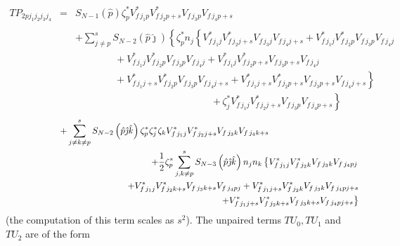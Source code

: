 \documentclass[aps,preprint]{revtex4}
\begin{document}
\begin{eqnarray*}
TP_{2pj_{1}j_{2}j_{3}j_{4}} &=&S_{N-1}\left( \hat{p}\right) \zeta _{p}^{\ast
}V_{f\,j_{1}p}^{\ast }V_{f\,j_{2}p+s}^{\ast }V_{f\,j_{3}p}V_{f\,j_{4}p+s} \\
&& \\
&&+\sum_{j\neq p}^{s}S_{N-2}\left( \hat{p}\hat{\jmath}\right) \left\{ \zeta
_{p}^{\ast }n_{j}\left\{ V_{f\,j_{1}j}^{\ast }V_{f\,j_{2}j+s}^{\ast
}V_{f\,j_{3}j}V_{f\,j_{4}j+s}+V_{f\,j_{1}j}^{\ast }V_{f\,j_{2}p}^{\ast
}V_{f\,j_{3}p}V_{f\,j_{4}j}\right. \right.  \\
&&\qquad \qquad +V_{f\,j_{1}j}^{\ast }V_{f\,j_{2}p}^{\ast
}V_{f\,j_{3}p}V_{f\,j_{4}j}+V_{f\,j_{1}j}^{\ast }V_{f\,j_{2}p+s}^{\ast
}V_{f\,j_{3}p+s}V_{f\,j_{4}j} \\
&&\qquad \qquad +\left. V_{f\,j_{1}j+s}^{\ast }V_{f\,j_{2}p}^{\ast
}V_{f\,j_{3}p}V_{f\,j_{4}j+s}+V_{f\,j_{1}j+s}^{\ast }V_{f\,j_{2}p+s}^{\ast
}V_{f\,j_{3}p+s}V_{f\,j_{4}j+s}\right\}  \\
&&\qquad \qquad \qquad \qquad \qquad \qquad \qquad \left. +\,\zeta
_{j}^{\ast }V_{f\,j_{1}j}^{\ast }V_{f\,j_{2}j+s}^{\ast
}V_{f\,j_{3}p}V_{f\,j_{4}p+s}\right\} 
\end{eqnarray*}%
\begin{eqnarray}
&&\qquad \qquad \quad +\sum_{j\neq k\neq p}^{s}S_{N-2}\left( \hat{p}\hat{%
\jmath}\hat{k}\right) \zeta _{p}^{\ast }\zeta _{j}^{\ast }\zeta
_{k}V_{f\,j_{1}j}^{\ast }V_{f\,j_{2}j+s}^{\ast
}V_{f\,j_{3}k}V_{f\,j_{4}k+s}\qquad \qquad \qquad \qquad \qquad   \notag \\
&&\qquad \qquad \qquad +\frac{1}{2}\zeta _{p}^{\ast }\sum_{j,k\neq
p}^{s}S_{N-3}\left( \hat{p}\hat{\jmath}\hat{k}\right) n_{j}n_{k}\left\{
V_{f\,j_{1}j}^{\ast }V_{f\,j_{2}k}^{\ast }V_{f\,j_{3}k}V_{f\,j_{4}pj}\right. 
\notag \\
&&\qquad \qquad \qquad \qquad +V_{f\,j_{1}j}^{\ast }V_{f\,j_{2}k+s}^{\ast
}V_{f\,j_{3}k+s}V_{f\,j_{4}pj}+V_{f\,j_{1}j+s}^{\ast }V_{f\,j_{2}k}^{\ast
}V_{f\,j_{3}k}V_{f\,j_{4}pj+s}  \notag \\
&&\qquad \qquad \qquad \qquad \qquad \qquad \qquad \qquad \qquad \qquad
\left. +V_{f\,j_{1}j+s}^{\ast }V_{f\,j_{2}k+s}^{\ast
}V_{f\,j_{3}k+s}V_{f\,j_{4}pj+s}\right\} 
\end{eqnarray}%
(the computation of this term scales as $s^{2}$). The unpaired terms $%
TU_{0},TU_{1}$ and $TU_{2}$ are of the form 
\end{document}
